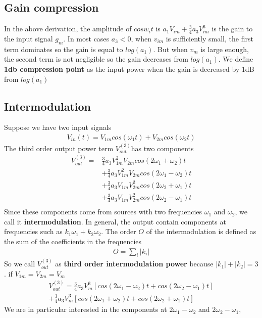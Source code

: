 \documentclass[a4paper]{article}
\begin{document}
\subsection{Gain compression}
In the above derivation, the amplitude of $cos w_i t$ is $a_1 V_{im} + \frac{3}{4} a_3 V^3_{im}$ is the gain to the input signal $g_m$. In most cases $a_3 < 0$, when $v_{im}$ is sufficiently small, the first term dominates so the gain is equal to $log(a_1)$. But when $v_m$ is large enough, the second term is not negligible so the gain decreases from $log(a_1)$. We define {\bf 1db compression point} as the input power when the gain is decreased by 1dB from $log(a_1)$
\subsection{Intermodulation}
Suppose we have two input signals
\begin{align*}
	V_{in}(t) = V_{1m} cos(\omega_1 t) + V_{2m} cos(\omega_2 t)
\end{align*}
The third order output power term $V^{(3)}_{out}$has two components 
\begin{align*}
	V^{(3)}_{out} = &  \frac{3}{4}a_3 V^2_{1m}V_{2m} cos(2\omega_1 + \omega_2)t \\
					& + \frac{3}{4}a_3 V^2_{1m}V_{2m} cos(2\omega_1 - \omega_2)t \\ 
					& + \frac{3}{4}a_3 V_{1m}V^2_{2m} cos(2\omega_2 + \omega_1)t \\
				    & + \frac{3}{4}a_3 V_{1m}V^2_{2m} cos(2\omega_2 - \omega_1)t \\	
\end{align*}
Since these components come from sources with two frequencies $\omega_1$ and $\omega_2$, we call it {\bf intermodulation}. In general, the output contain components at frequencies such as $k_1 \omega_1 + k_2 \omega_2$. The order $O$ of the intermodulation is defined as the sum of the coefficients in the frequencies
\begin{align*}
	O = \sum_i|k_i|
\end{align*}
So we call $V^{(3)}_{out}$ as {\bf third order intermodulation power} because $|k_1| + |k_2| = 3$.
if $V_{1m} = V_{2m} = V_m$
\begin{align*}
	V^{(3)}_{out} = \frac{3}{4}a_3 V^3_{m}[cos(2\omega_1 - \omega_2)t +  cos(2\omega_2 - \omega_1)t] \\
					+ \frac{3}{4}a_3 V^3_{m}[cos(2\omega_1 + \omega_2)t +  cos(2\omega_2 + \omega_1)t]
\end{align*}
We are in particular interested in the components at $2\omega_1 - \omega_2$ and $2\omega_2 - \omega_1$,
\end{document}
